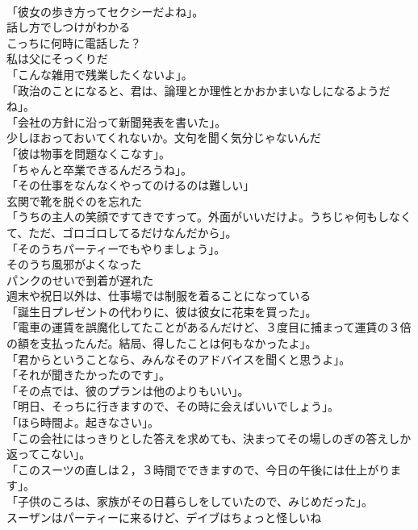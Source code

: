 \documentclass[8pt]{extreport}
\begin{document}
\begin{CJK}{UTF8}{min}
\\	「彼女の歩き方ってセクシーだよね」。	
\\	話し方でしつけがわかる	
\\	こっちに何時に電話した？	
\\	私は父にそっくりだ	
\\	「こんな雑用で残業したくないよ」。	
\\	「政治のことになると、君は、論理とか理性とかおかまいなしになるようだね」。	
\\	「会社の方針に沿って新聞発表を書いた」。	
\\	少しほおっておいてくれないか。文句を聞く気分じゃないんだ	
\\	「彼は物事を問題なくこなす」。	
\\	「ちゃんと卒業できるんだろうね」。	
\\	「その仕事をなんなくやってのけるのは難しい」	
\\	玄関で靴を脱ぐのを忘れた	
\\	「うちの主人の笑顔ですてきですって。外面がいいだけよ。うちじゃ何もしなくて、ただ、ゴロゴロしてるだけなんだから」。	
\\	「そのうちパーティーでもやりましょう」。	
\\	そのうち風邪がよくなった	
\\	パンクのせいで到着が遅れた	
\\	週末や祝日以外は、仕事場では制服を着ることになっている	
\\	「誕生日プレゼントの代わりに、彼は彼女に花束を買った」。	
\\	「電車の運賃を誤魔化してたことがあるんだけど、３度目に捕まって運賃の３倍の額を支払ったんだ。結局、得したことは何もなかったよ」。	
\\	「君からということなら、みんなそのアドバイスを聞くと思うよ」。	
\\	「それが聞きたかったのです」。	
\\	「その点では、彼のプランは他のよりもいい」。	
\\	「明日、そっちに行きますので、その時に会えばいいでしょう」。	
\\	「ほら時間よ。起きなさい」。	
\\	「この会社にはっきりとした答えを求めても、決まってその場しのぎの答えしか返ってこない」。	
\\	「このスーツの直しは２，３時間でできますので、今日の午後には仕上がります」。	
\\	「子供のころは、家族がその日暮らしをしていたので、みじめだった」。	
\\	スーザンはパーティーに来るけど、デイブはちょっと怪しいね	

\end{CJK}
\end{document}
